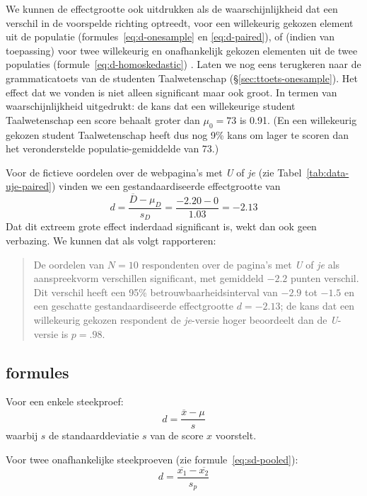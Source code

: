 \documentclass[
]{book}
\begin{document}
We kunnen de effectgrootte ook uitdrukken als de waarschijnlijkheid dat
een verschil in de voorspelde richting optreedt, voor een willekeurig
gekozen element uit de populatie
(formules~\eqref{eq:d-onesample} en \eqref{eq:d-paired}),
of (indien van toepassing) voor twee
willekeurig en onafhankelijk gekozen elementen uit de twee populaties
(formule~\eqref{eq:d-homoskedastic}) \citep{McGraw92}. Laten we nog eens
terugkeren naar de grammaticatoets van de studenten Taalwetenschap
(§\ref{sec:ttoets-onesample}). Het effect dat we vonden is niet
alleen significant maar ook groot. In termen van waarschijnlijkheid
uitgedrukt: de kans dat een willekeurige student Taalwetenschap een
score behaalt groter dan \(\mu_0=73\) is 0.91. (En een willekeurig gekozen
student Taalwetenschap heeft dus nog 9\% kans om lager te scoren dan het
veronderstelde populatie-gemiddelde van 73.)

Voor de fictieve oordelen over de webpagina's met \emph{U} of \emph{je} (zie
Tabel~\ref{tab:data-uje-paired}) vinden we een gestandaardiseerde
effectgrootte van
\[d = \frac{ \overline{D}-\mu_D} {s_D} = \frac{ -2.20-0 } {1.03} = -2.13\]
Dat dit extreem grote effect inderdaad significant is, wekt dan ook geen
verbazing. We kunnen dat als volgt rapporteren:

\begin{quote}
De oordelen van \(N=10\) respondenten over de pagina's met \emph{U} of \emph{je}
als aanspreekvorm verschillen significant, met gemiddeld \(-2.2\) punten
verschil. Dit verschil heeft een 95\% betrouwbaarheidsinterval van
\(-2.9\) tot \(-1.5\) en een geschatte gestandaardiseerde effectgrootte
\(d=-2.13\); de kans dat een willekeurig gekozen respondent de
\emph{je}-versie hoger beoordeelt dan de \emph{U}-versie is \(p=.98\).
\end{quote}

\hypertarget{sec:formules13-5}{%
\subsection{formules}\label{sec:formules13-5}}

Voor een enkele steekproef:
\begin{equation}
   \label{eq:d-onesample}
  d = \frac{\overline{x}-\mu}{s}
\end{equation}
waarbij \(s\) de standaarddeviatie \(s\)
van de score \(x\) voorstelt.

Voor twee onafhankelijke steekproeven (zie
formule~\eqref{eq:sd-pooled}):
\begin{equation}
  \label{eq:d-homoskedastic}
  d = \frac{ \overline{x_1}-\overline{x_2} } { s_p }
\end{equation}
\end{document}
